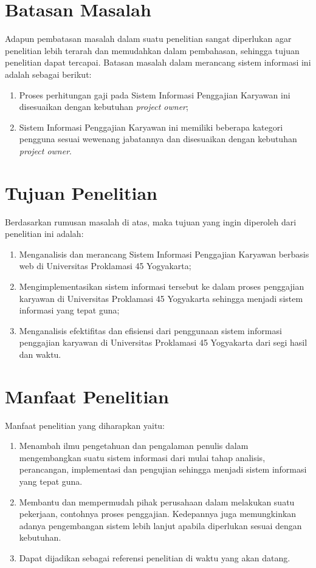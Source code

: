 \section{Batasan Masalah}
Adapun pembatasan masalah dalam suatu penelitian sangat diperlukan agar penelitian lebih terarah dan memudahkan dalam pembahasan, sehingga tujuan penelitian dapat tercapai. Batasan masalah dalam merancang sistem informasi ini adalah sebagai berikut:
\begin{enumerate}
\itemsep0em
\item Proses perhitungan gaji pada Sistem Informasi Penggajian Karyawan ini disesuaikan dengan kebutuhan \emph{project owner};
\item Sistem Informasi Penggajian Karyawan ini memiliki beberapa kategori pengguna sesuai wewenang jabatannya dan disesuaikan dengan kebutuhan \emph{project owner}.
\end{enumerate}

\section{Tujuan Penelitian}
Berdasarkan rumusan masalah di atas, maka tujuan yang ingin diperoleh dari penelitian ini adalah:
\begin{enumerate}
\itemsep0em
\item Menganalisis dan merancang Sistem Informasi Penggajian Karyawan berbasis web di Universitas Proklamasi 45 Yogyakarta;
\item Mengimplementasikan sistem informasi tersebut ke dalam proses penggajian karyawan di Universitas Proklamasi 45 Yogyakarta sehingga menjadi sistem informasi yang tepat guna;
\item Menganalisis efektifitas dan efisiensi dari penggunaan sistem informasi penggajian karyawan di Universitas Proklamasi 45 Yogyakarta dari segi hasil dan waktu.
\end{enumerate}

\section{Manfaat Penelitian}
    Manfaat penelitian yang diharapkan yaitu:
    \begin{enumerate}
        \itemsep0em
        \item Menambah ilmu pengetahuan dan pengalaman penulis dalam mengembangkan suatu sistem informasi dari mulai tahap analisis, perancangan, implementasi dan pengujian sehingga menjadi sistem informasi yang tepat guna.
        \item Membantu dan mempermudah pihak perusahaan dalam melakukan suatu pekerjaan, contohnya proses penggajian. Kedepannya juga memungkinkan adanya pengembangan sistem lebih lanjut apabila diperlukan sesuai dengan kebutuhan.
        \item Dapat dijadikan sebagai referensi penelitian di waktu yang akan datang.
    \end{enumerate}

